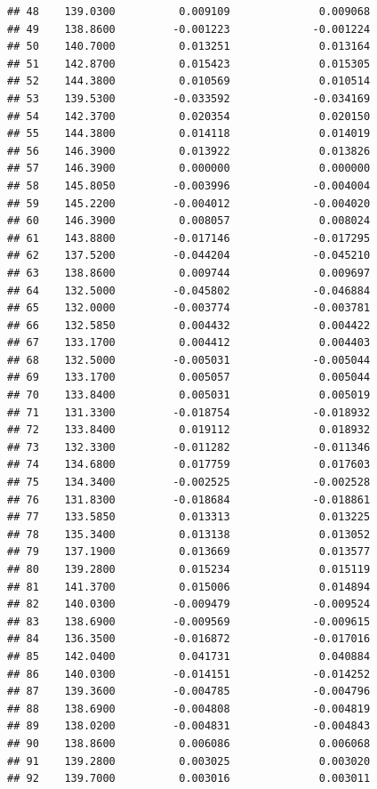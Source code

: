 \documentclass[
]{article}
\begin{document}
\begin{verbatim}
## 48    139.0300          0.009109              0.009068
## 49    138.8600         -0.001223             -0.001224
## 50    140.7000          0.013251              0.013164
## 51    142.8700          0.015423              0.015305
## 52    144.3800          0.010569              0.010514
## 53    139.5300         -0.033592             -0.034169
## 54    142.3700          0.020354              0.020150
## 55    144.3800          0.014118              0.014019
## 56    146.3900          0.013922              0.013826
## 57    146.3900          0.000000              0.000000
## 58    145.8050         -0.003996             -0.004004
## 59    145.2200         -0.004012             -0.004020
## 60    146.3900          0.008057              0.008024
## 61    143.8800         -0.017146             -0.017295
## 62    137.5200         -0.044204             -0.045210
## 63    138.8600          0.009744              0.009697
## 64    132.5000         -0.045802             -0.046884
## 65    132.0000         -0.003774             -0.003781
## 66    132.5850          0.004432              0.004422
## 67    133.1700          0.004412              0.004403
## 68    132.5000         -0.005031             -0.005044
## 69    133.1700          0.005057              0.005044
## 70    133.8400          0.005031              0.005019
## 71    131.3300         -0.018754             -0.018932
## 72    133.8400          0.019112              0.018932
## 73    132.3300         -0.011282             -0.011346
## 74    134.6800          0.017759              0.017603
## 75    134.3400         -0.002525             -0.002528
## 76    131.8300         -0.018684             -0.018861
## 77    133.5850          0.013313              0.013225
## 78    135.3400          0.013138              0.013052
## 79    137.1900          0.013669              0.013577
## 80    139.2800          0.015234              0.015119
## 81    141.3700          0.015006              0.014894
## 82    140.0300         -0.009479             -0.009524
## 83    138.6900         -0.009569             -0.009615
## 84    136.3500         -0.016872             -0.017016
## 85    142.0400          0.041731              0.040884
## 86    140.0300         -0.014151             -0.014252
## 87    139.3600         -0.004785             -0.004796
## 88    138.6900         -0.004808             -0.004819
## 89    138.0200         -0.004831             -0.004843
## 90    138.8600          0.006086              0.006068
## 91    139.2800          0.003025              0.003020
## 92    139.7000          0.003016              0.003011

\end{verbatim}
\end{document}
